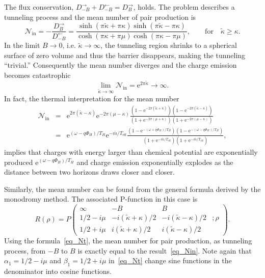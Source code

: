 \documentclass[aps,nofootinbib,superscriptaddress
]{revtex4}
\begin{document}
The flux conservation, $D_{-B}^\rightarrow + D_{-B}^\leftarrow = D_B^\rightarrow$, holds. The problem describes a tunneling process and the mean number of pair production is
\begin{equation} \label{eq_Nin}
\mathcal{N}_\mathrm{in} = - \frac{D_B^\rightarrow}{D_{-B}^\leftarrow} = \frac{\sinh(\pi \tilde{\kappa} + \pi \kappa) \sinh(\pi \tilde{\kappa} - \pi \kappa)}{\cosh(\pi \kappa + \pi \mu) \cosh(\pi \kappa - \pi \mu)}, \qquad \mathrm{for} \quad \tilde{\kappa} \ge \kappa.
\end{equation}
In the limit $B \to 0$, i.e. $\tilde{\kappa} \to \infty$, the tunneling region shrinks to a spherical surface of zero volume and thus the barrier disappears, making the tunneling ``trivial.'' Consequently the mean number diverges and the charge emission becomes catastrophic
\begin{equation}
\lim_{\tilde{\kappa} \to \infty} \mathcal{N}_\mathrm{in} = \mathrm{e}^{2 \pi \tilde{\kappa}} \to \infty.
\end{equation}
In fact, the thermal interpretation for the mean number
\begin{eqnarray}
\mathcal{N}_\mathrm{in} &=& \mathrm{e}^{2 \pi (\tilde{\kappa} - \kappa)} \mathrm{e}^{-2 \pi(\mu - \kappa)} \frac{(1 - \mathrm{e}^{-2 \pi (\tilde{\kappa} + \kappa)}) (1 - \mathrm{e}^{-2 \pi (\tilde{\kappa} - \kappa)})}{(1 + \mathrm{e}^{-2 \pi (\mu + \kappa)}) (1 + \mathrm{e}^{-2 \pi (\mu - \kappa)})}
\nonumber\\
&=& \mathrm{e}^{(\omega - q \Phi_H)/T_H} \mathrm{e}^{- \bar{m}/T_\mathrm{eff}} \frac{\left( 1 - \mathrm{e}^{-(\omega + q \Phi_H)/T_H} \right) \left( 1 - \mathrm{e}^{-(\omega - q \Phi_H)/T_H} \right)}{\left( 1 + \mathrm{e}^{-\bar{m}/T_\mathrm{eff}} \right) \left( 1 + \mathrm{e}^{-\bar{m}/\bar{T}_\mathrm{eff}} \right)},
\end{eqnarray}
implies that charges with energy larger than chemical potential are exponentially produced $\mathrm{e}^{(\omega - q \Phi_H)/T_H}$ and charge emission exponentially explodes as the distance between two horizons draws closer and closer.


Similarly, the mean number can be found from the general formula derived by the monodromy method. The associated P-function in this case is
\begin{equation}
R(\rho) = P\begin{pmatrix} \infty & -B & B & \\ 1/2 - i\mu & -i (\tilde{\kappa} + \kappa)/2 & -i (\tilde{\kappa} - \kappa)/2 & ; \rho \\ 1/2 + i \mu & i (\tilde{\kappa} + \kappa)/2 & i (\tilde{\kappa} - \kappa)/2 & \end{pmatrix}.
\end{equation}
Using the formula~\eqref{eq_Nt}, the mean number for pair production, as tunneling process, from $-B$ to $B$ is exactly equal to the result~\eqref{eq_Nin}. Note again that $\alpha_1 = 1/2 - i \mu$ and $\beta_1 = 1/2 + i \mu$ in~\eqref{eq_Nt} change sine functions in the denominator into cosine functions.
\end{document}
